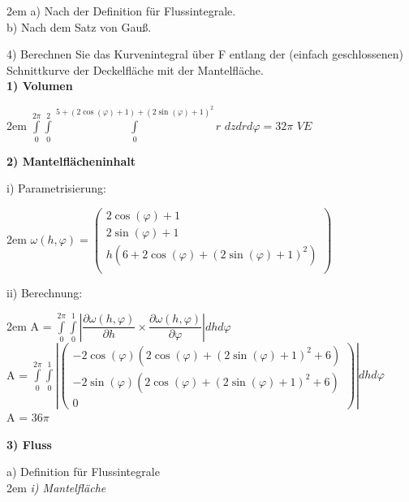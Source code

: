 \documentclass[11pt,final]{scrreprt}
\begin{document}
\begingroup
\leftskip2em 
a) Nach der Definition für Flussintegrale.\\
b) Nach dem Satz von Gauß.
\par	
\endgroup

4) Berechnen Sie das Kurvenintegral über F entlang der (einfach geschlossenen) Schnittkurve der Deckelfläche mit der Mantelfläche.\\

\textbf{1) Volumen}

\begingroup
\leftskip2em 
$ \int\limits_{0}^{2\pi}\int\limits_{0}^{2}\int\limits_{0}^{5+(2\cos(\varphi)+1)+(2\sin(\varphi)+1)^2} r$ $dzdrd\varphi  = 32\pi$ $VE$\\
\par	
\endgroup

\textbf{2) Mantelflächeninhalt}

i) Parametrisierung:

\begingroup
\leftskip2em 
$ \omega(h, \varphi) = \left(\begin{matrix}
2\cos(\varphi)+1\\ 2\sin(\varphi)+1\\ h(6+2\cos(\varphi)+(2\sin(\varphi)+1)^2)\\
\end{matrix}\right) $\\
\par	
\endgroup

ii) Berechnung:

\begingroup
\leftskip2em 
A = $\int\limits_{0}^{2\pi}\int\limits_{0}^{1}\left| \dfrac{\partial \omega(h, \varphi)}{\partial h}\times \dfrac{\partial \omega(h, \varphi)}{\partial \varphi} \right|dhd\varphi $\\
A = $\int\limits_{0}^{2\pi}\int\limits_{0}^{1}\left|\left( \begin{matrix}
-2\cos(\varphi)(2\cos(\varphi) + (2\sin(\varphi) + 1)^2 + 6)\\-2\sin(\varphi)(2\cos(\varphi) + (2\sin(\varphi) + 1)^2 + 6)\\0
\end{matrix} \right)\right|dhd\varphi $\\
A = $36\pi$\\
\par	
\endgroup

\textbf{3) Fluss}

a) Definition für Flussintegrale\\

\begingroup
\leftskip2em 
\emph{i) Mantelfläche}\\
\end{document}
